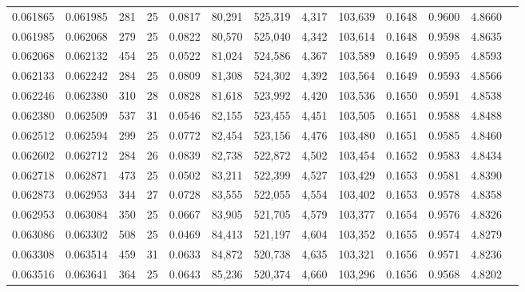 \begin{tabular}{rrrrrrrrrrrrr}
0.061865 & 0.061985 & 281 &  25 &                                     0.0817 &  80,291 & 525,319 &   4,317 & 103,639 & 0.1648 & 0.9600 & 4.8660 \\
0.061985 & 0.062068 & 279 &  25 &                                     0.0822 &  80,570 & 525,040 &   4,342 & 103,614 & 0.1648 & 0.9598 & 4.8635 \\
0.062068 & 0.062132 & 454 &  25 &                                     0.0522 &  81,024 & 524,586 &   4,367 & 103,589 & 0.1649 & 0.9595 & 4.8593 \\
0.062133 & 0.062242 & 284 &  25 &                                     0.0809 &  81,308 & 524,302 &   4,392 & 103,564 & 0.1649 & 0.9593 & 4.8566 \\
0.062246 & 0.062380 & 310 &  28 &                                     0.0828 &  81,618 & 523,992 &   4,420 & 103,536 & 0.1650 & 0.9591 & 4.8538 \\
0.062380 & 0.062509 & 537 &  31 &                                     0.0546 &  82,155 & 523,455 &   4,451 & 103,505 & 0.1651 & 0.9588 & 4.8488 \\
0.062512 & 0.062594 & 299 &  25 &                                     0.0772 &  82,454 & 523,156 &   4,476 & 103,480 & 0.1651 & 0.9585 & 4.8460 \\
0.062602 & 0.062712 & 284 &  26 &                                     0.0839 &  82,738 & 522,872 &   4,502 & 103,454 & 0.1652 & 0.9583 & 4.8434 \\
0.062718 & 0.062871 & 473 &  25 &                                     0.0502 &  83,211 & 522,399 &   4,527 & 103,429 & 0.1653 & 0.9581 & 4.8390 \\
0.062873 & 0.062953 & 344 &  27 &                                     0.0728 &  83,555 & 522,055 &   4,554 & 103,402 & 0.1653 & 0.9578 & 4.8358 \\
0.062953 & 0.063084 & 350 &  25 &                                     0.0667 &  83,905 & 521,705 &   4,579 & 103,377 & 0.1654 & 0.9576 & 4.8326 \\
0.063086 & 0.063302 & 508 &  25 &                                     0.0469 &  84,413 & 521,197 &   4,604 & 103,352 & 0.1655 & 0.9574 & 4.8279 \\
0.063308 & 0.063514 & 459 &  31 &                                     0.0633 &  84,872 & 520,738 &   4,635 & 103,321 & 0.1656 & 0.9571 & 4.8236 \\
0.063516 & 0.063641 & 364 &  25 &                                     0.0643 &  85,236 & 520,374 &   4,660 & 103,296 & 0.1656 & 0.9568 & 4.8202 \\

\end{tabular}
